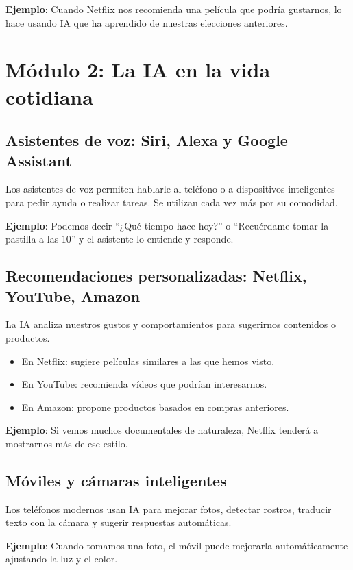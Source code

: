 \documentclass[12pt]{article}
\begin{document}
	\textbf{Ejemplo}: Cuando Netflix nos recomienda una película que podría gustarnos, lo hace usando IA que ha aprendido de nuestras elecciones anteriores.
	
	\newpage
	
	\section{\textbf{\normalsize Módulo 2: La IA en la vida cotidiana}}
	
	\subsection*{Asistentes de voz: Siri, Alexa y Google Assistant}
	Los asistentes de voz permiten hablarle al teléfono o a dispositivos inteligentes para pedir ayuda o realizar tareas. Se utilizan cada vez más por su comodidad.
	
	\textbf{Ejemplo}: Podemos decir “¿Qué tiempo hace hoy?” o “Recuérdame tomar la pastilla a las 10” y el asistente lo entiende y responde.
	
	\subsection*{Recomendaciones personalizadas: Netflix, YouTube, Amazon}
	La IA analiza nuestros gustos y comportamientos para sugerirnos contenidos o productos.
	\begin{itemize}
		\item En Netflix: sugiere películas similares a las que hemos visto.
		\item En YouTube: recomienda vídeos que podrían interesarnos.
		\item En Amazon: propone productos basados en compras anteriores.
	\end{itemize}
	
	\textbf{Ejemplo}: Si vemos muchos documentales de naturaleza, Netflix tenderá a mostrarnos más de ese estilo.
	
	\subsection*{Móviles y cámaras inteligentes}
	Los teléfonos modernos usan IA para mejorar fotos, detectar rostros, traducir texto con la cámara y sugerir respuestas automáticas.
	
	\textbf{Ejemplo}: Cuando tomamos una foto, el móvil puede mejorarla automáticamente ajustando la luz y el color.
	
\end{document}
